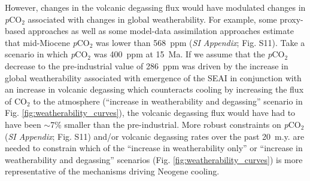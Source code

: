 \documentclass[9pt,twocolumn,twoside,lineno]{pnas-new}
\newcommand{\pCOtwo}{\textit{p}CO$_{2}$\xspace}
\newcommand{\COtwo}{CO$_{2}$\xspace}
\newcommand{\SI}{\textit{SI Appendix}\xspace}
\begin{document}
However, changes in the volcanic degassing flux would have modulated changes in \pCOtwo associated with changes in global weatherability. For example, some proxy-based approaches as well as some model-data assimilation approaches estimate that mid-Miocene \pCOtwo was lower than 568~ppm (\SI; Fig. S11). Take a scenario in which \pCOtwo was 400~ppm at 15~Ma. If we assume that the \pCOtwo decrease to the pre-industrial value of 286~ppm was driven by the increase in global weatherability associated with emergence of the SEAI in conjunction with an increase in volcanic degassing which counteracts cooling by increasing the flux of \COtwo to the atmosphere (``increase in weatherability and degassing'' scenario in Fig. \ref{fig:weatherability_curves}), the volcanic degassing flux would have had to have been $\sim$7\% smaller than the pre-industrial. More robust constraints on \pCOtwo (\SI; Fig. S11) and/or volcanic degassing rates over the past 20~m.y. are needed to constrain which of the ``increase in weatherability only'' or ``increase in weatherability and degassing'' scenarios (Fig. \ref{fig:weatherability_curves}) is more representative of the mechanisms driving Neogene cooling.
\end{document}
